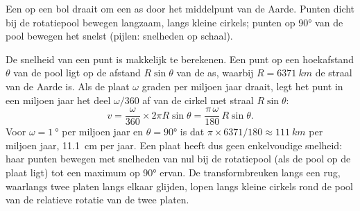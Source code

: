 \begin{omfigure}

{\small Een  op een bol draait om een as door het middelpunt van
de Aarde. Punten dicht bij de rotatiepool bewegen langzaam, langs kleine cirkels;
punten op \ang{90} van de pool bewegen het snelst (pijlen: snelheden op schaal).}
\end{omfigure}

De snelheid van een punt is makkelijk te berekenen. Een punt op een hoekafstand
$\theta$ van de pool ligt op de afstand $R\sin\theta$ van de as, waarbij
$R = \qty{6371}{km}$ de straal van de Aarde is. Als de plaat $\omega$
graden per miljoen jaar draait, legt het punt in een miljoen jaar het deel
$\omega/360$ af van de cirkel met straal $R\sin\theta$:
\[
  v = \frac{\omega}{360} \times 2\pi R\sin\theta
    = \frac{\pi\,\omega}{180}\,R\sin\theta .
\]
Voor $\omega = \qty{1}{\degree}$ per miljoen jaar en $\theta = \ang{90}$
is dat $\pi \times 6371/180 \approx \qty{111}{km}$ per miljoen jaar,
\qty{11.1}{cm} per jaar. Een plaat heeft dus geen enkelvoudige snelheid: haar punten
bewegen met snelheden van nul bij de rotatiepool (als de pool op de
plaat ligt) tot een maximum op \ang{90} ervan. De transformbreuken langs een rug,
waarlangs twee platen langs elkaar glijden, lopen langs kleine cirkels rond de
pool van de relatieve rotatie van de twee platen.

